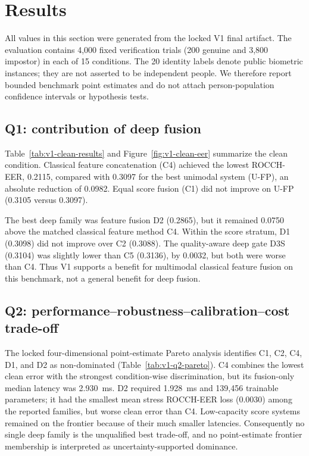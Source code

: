 \section{Results}
\label{sec:results}

All values in this section were generated from the locked V1 final artifact. The
evaluation contains 4,000 fixed verification trials (200 genuine and 3,800
impostor) in each of 15 conditions. The 20 identity labels denote public
biometric instances; they are not asserted to be independent people. We
therefore report bounded benchmark point estimates and do not attach
person-population confidence intervals or hypothesis tests.

\subsection{Q1: contribution of deep fusion}

Table~\ref{tab:v1-clean-results} and Figure~\ref{fig:v1-clean-eer} summarize the
clean condition. Classical feature concatenation (C4) achieved the lowest
ROCCH-EER, 0.2115, compared with 0.3097 for the best unimodal system (U-FP), an
absolute reduction of 0.0982. Equal score fusion (C1) did not improve on U-FP
(0.3105 versus 0.3097).

The best deep family was feature fusion D2 (0.2865), but it remained 0.0750
above the matched classical feature method C4. Within the score stratum, D1
(0.3098) did not improve over C2 (0.3088). The quality-aware deep gate D3S
(0.3104) was slightly lower than C5 (0.3136), by 0.0032, but both were worse
than C4. Thus V1 supports a benefit for multimodal classical feature fusion on
this benchmark, not a general benefit for deep fusion.




\subsection{Q2: performance--robustness--calibration--cost trade-off}

The locked four-dimensional point-estimate Pareto analysis identifies C1, C2,
C4, D1, and D2 as non-dominated (Table~\ref{tab:v1-q2-pareto}). C4 combines the
lowest clean error with the strongest condition-wise discrimination, but its
fusion-only median latency was 2.930~ms. D2 required 1.928~ms and 139,456
trainable parameters; it had the smallest mean stress ROCCH-EER loss (0.0030)
among the reported families, but worse clean error than C4. Low-capacity score
systems remained on the frontier because of their much smaller latencies.
Consequently no single deep family is the unqualified best trade-off, and no
point-estimate frontier membership is interpreted as uncertainty-supported
dominance.

